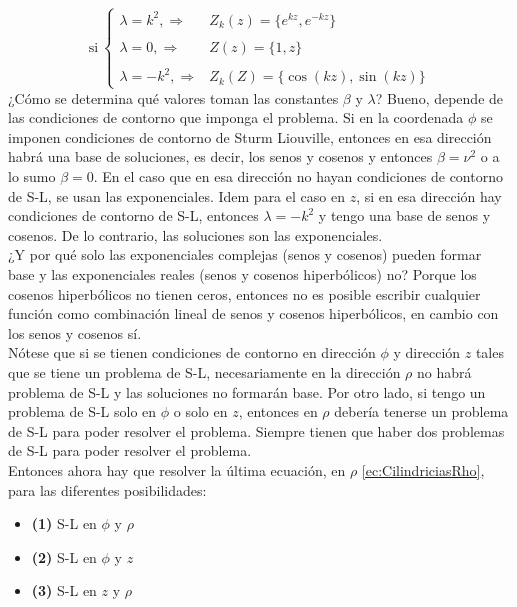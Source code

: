 \begin{equation*}
    \mbox{si}\ \left\{
        \begin{matrix}
            \lambda = k^{2}, \Longrightarrow 
            &Z_{k}(z) = \{e^{kz}, e^{-kz} \}\\
            &\\
            \lambda = 0, \Longrightarrow 
            &Z(z) = \{1, z\}\\
            &\\
            \lambda = -k^{2}, \Longrightarrow
            &Z_{k}(Z) = \{\cos{(kz)}, \sin{(kz)} \}
        \end{matrix}
    \right.
\end{equation*}
¿Cómo se determina qué valores toman las constantes $\beta$ y $\lambda$? Bueno, depende de las condiciones de contorno que imponga el problema. Si en la coordenada $\phi$ se imponen condiciones de contorno de Sturm Liouville, entonces en esa dirección habrá una base de soluciones, es decir, los senos y cosenos y entonces $\beta = \nu^{2}$ o a lo sumo $\beta =0$. En el caso que en esa dirección no hayan condiciones de contorno de S-L, se usan las exponenciales. Idem para el caso en $z$, si en esa dirección hay condiciones de contorno de S-L, entonces $\lambda = -k^{2}$ y tengo una base de senos y cosenos. De lo contrario, las soluciones son las exponenciales.\\
\indent ¿Y por qué solo las exponenciales complejas (senos y cosenos) pueden formar base y las exponenciales reales (senos y cosenos hiperbólicos) no? Porque los cosenos hiperbólicos no tienen ceros, entonces no es posible escribir cualquier función como combinación lineal de senos y cosenos hiperbólicos, en cambio con los senos y cosenos sí.\\
\indent Nótese que si se tienen condiciones de contorno en dirección $\phi$ y dirección $z$ tales que se tiene un problema de S-L, necesariamente en la dirección $\rho$ no habrá problema de S-L y las soluciones no formarán base. Por otro lado, si tengo un problema de S-L solo en $\phi$ o solo en $z$, entonces en $\rho$ debería tenerse un problema de S-L para poder resolver el problema. Siempre tienen que haber dos problemas de S-L para poder resolver el problema.\\
\indent Entonces ahora hay que resolver la última ecuación, en $\rho$ \eqref{ec:CilindriciasRho}, para las diferentes posibilidades:
\begin{itemize}
    \item \textbf{(1)} S-L en $\phi$ y $\rho$
    \item \textbf{(2)} S-L en $\phi$ y $z$
    \item \textbf{(3)} S-L en $z$ y $\rho$
\end{itemize}
